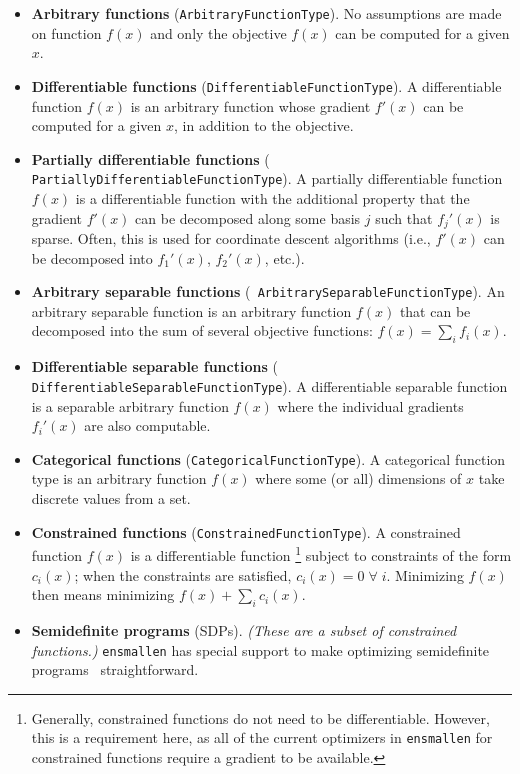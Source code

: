\begin{itemize}
\item {\bf Arbitrary functions} ({\tt ArbitraryFunctionType}).
No assumptions are made on function $f(x)$ and only the objective
$f(x)$ can be computed for a given $x$.

\item {\bf Differentiable functions} ({\tt DifferentiableFunctionType}).
A differentiable function $f(x)$ is an arbitrary function whose gradient $f'(x)$
can be computed for a given $x$, in addition to the objective.

\item {\bf Partially differentiable functions} ({\tt
PartiallyDifferentiableFunctionType}).  A partially differentiable function
$f(x)$ is a differentiable function with the additional property that the
gradient $f'(x)$ can be decomposed along some basis $j$ such that $f_j'(x)$ is
sparse.  Often, this is used for coordinate descent algorithms (i.e., $f'(x)$
can be decomposed into $f_{1}'(x)$, $f_{2}'(x)$, etc.).

\item {\bf Arbitrary separable functions} ({\tt
ArbitrarySeparableFunctionType}).  An arbitrary separable function is an
arbitrary function $f(x)$ that can be decomposed into the sum of several
objective functions: $f(x) = \sum\nolimits_i f_i(x)$.

\item {\bf Differentiable separable functions} ({\tt
DifferentiableSeparableFunctionType}).  A differentiable separable function is a
separable arbitrary function $f(x)$ where the individual gradients $f_i'(x)$ are
also computable.

\item {\bf Categorical functions} ({\tt CategoricalFunctionType}).  A
categorical function type is an arbitrary function $f(x)$ where some (or all)
dimensions of $x$ take discrete values from a set.

\item {\bf Constrained functions} ({\tt ConstrainedFunctionType}).
A constrained function $f(x)$ is a differentiable function%
\footnote{Generally, constrained functions  do not need to be differentiable.
However, this is a requirement here, as all of the current optimizers in {\tt ensmallen}
for constrained functions require a gradient to be available.}
subject to constraints of the form $c_i(x)$; when the constraints are satisfied, $c_i(x) = 0\; \forall \; i$.
Minimizing $f(x)$ then means minimizing $f(x) + \sum_i c_i(x)$.

\item {\bf Semidefinite programs} (SDPs).  {\it (These are a subset of
constrained functions.)}  {\tt ensmallen} has special
support to make optimizing semidefinite
programs~\cite{vandenberghe1996semidefinite} straightforward.
\end{itemize}



